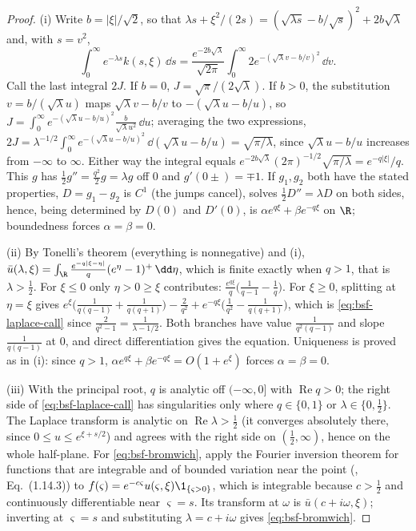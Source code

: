 \begin{proof}
(i) Write $b=|\xi|/\sqrt2$, so that $\lambda s+\xi^2/(2s)=(\sqrt{\lambda s}-b/\sqrt s)^2+2b\sqrt\lambda$ and,
with $s=v^2$,
\[
  \int_0^\infty e^{-\lambda s}k(s,\xi)\,\dd s=\frac{e^{-2b\sqrt\lambda}}{\sqrt{2\pi}}\int_0^\infty2e^{-(\sqrt\lambda v-b/v)^2}\,\dd v .
\]
Call the last integral $2J$. If $b=0$, $J=\sqrt\pi/(2\sqrt\lambda)$. If $b>0$, the substitution
$v=b/(\sqrt\lambda u)$ maps $\sqrt\lambda v-b/v$ to $-(\sqrt\lambda u-b/u)$, so
$J=\int_0^\infty e^{-(\sqrt\lambda u-b/u)^2}\frac{b}{\sqrt\lambda u^2}\,\dd u$; averaging the two expressions,
$2J=\lambda^{-1/2}\int_0^\infty e^{-(\sqrt\lambda u-b/u)^2}\,\dd(\sqrt\lambda u-b/u)=\sqrt{\pi/\lambda}$, since
$\sqrt\lambda u-b/u$ increases from $-\infty$ to $\infty$. Either way the integral equals
$e^{-2b\sqrt\lambda}(2\pi)^{-1/2}\sqrt{\pi/\lambda}=e^{-q|\xi|}/q$. This $g$ has $\frac12g''=\frac{q^2}{2}g=\lambda g$
off $0$ and $g'(0\pm)=\mp1$. If $g_1,g_2$ both have the stated properties, $D=g_1-g_2$ is $C^1$ (the
jumps cancel), solves $\frac12D''=\lambda D$ on both sides, hence, being determined by $D(0)$ and $D'(0)$,
is $\alpha e^{q\xi}+\beta e^{-q\xi}$ on $\R$; boundedness forces $\alpha=\beta=0$.

(ii) By Tonelli's theorem (everything is nonnegative) and (i),
$\bar u(\lambda,\xi)=\int_\R\frac{e^{-q|\xi-\eta|}}{q}(e^\eta-1)^+\,\dd\eta$, which is finite exactly when
$q>1$, that is $\lambda>\frac12$. For $\xi\le0$ only $\eta>0\ge\xi$ contributes:
$\frac{e^{q\xi}}q\big(\frac1{q-1}-\frac1q\big)$. For $\xi\ge0$, splitting at $\eta=\xi$ gives
$e^\xi\big(\frac1{q(q-1)}+\frac1{q(q+1)}\big)-\frac2{q^2}+e^{-q\xi}\big(\frac1{q^2}-\frac1{q(q+1)}\big)$, which is
\eqref{eq:bsf-laplace-call} since $\frac2{q^2-1}=\frac1{\lambda-1/2}$. Both branches have value $\frac1{q^2(q-1)}$ and
slope $\frac1{q(q-1)}$ at $0$, and direct differentiation gives the equation. Uniqueness is proved as in (i):
since $q>1$, $\alpha e^{q\xi}+\beta e^{-q\xi}=O(1+e^\xi)$ forces $\alpha=\beta=0$.

(iii) With the principal root, $q$ is analytic off $(-\infty,0]$ with $\operatorname{Re}q>0$; the right side
of \eqref{eq:bsf-laplace-call} has singularities only where $q\in\{0,1\}$ or $\lambda\in\{0,\frac12\}$. The
Laplace transform is analytic on $\operatorname{Re}\lambda>\frac12$ (it converges absolutely there, since
$0\le u\le e^{\xi+s/2}$) and agrees with the right side on $(\frac12,\infty)$, hence on the whole half-plane.
For \eqref{eq:bsf-bromwich}, apply the Fourier inversion theorem for functions that are integrable and of
bounded variation near the point (\textcite{dlmf}, Eq.~(1.14.3)) to $f(\varsigma)=e^{-c\varsigma}u(\varsigma,\xi)\1_{\{\varsigma>0\}}$,
which is integrable because $c>\frac12$ and continuously differentiable near $\varsigma=s$. Its transform at
$\omega$ is $\bar u(c+i\omega,\xi)$; inverting at $\varsigma=s$ and substituting $\lambda=c+i\omega$ gives
\eqref{eq:bsf-bromwich}.
\end{proof}

